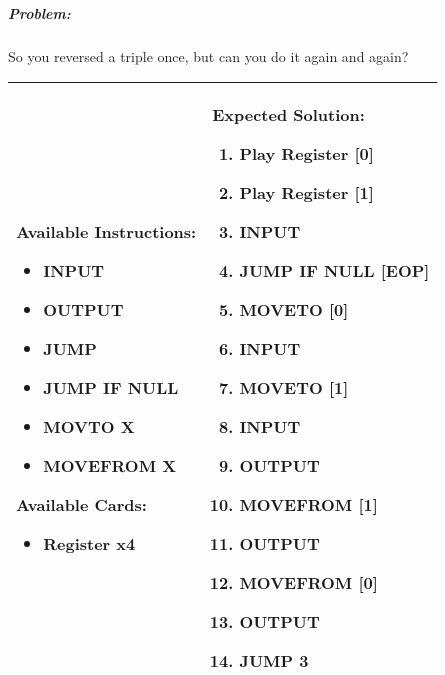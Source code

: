 \subparagraph{Problem:} So you reversed a triple once, but can you do it again and again?

\begin{center}
    \begin{tabular}{ | m{5cm} | m{9cm} | } 
        \hline
            \textbf{Available Instructions:} 
            \begin{itemize}
                \setlength\itemsep{-.35em}
                \item INPUT
                \item OUTPUT
                \item JUMP
                \item JUMP IF NULL
                \item MOVTO X
                \item MOVEFROM X
            \end{itemize}
            \textbf{Available Cards:} 
            \begin{itemize}
                \setlength\itemsep{-.35em}
                \item Register x4
            \end{itemize}& 
            \textbf{Expected Solution:} 
            \begin{enumerate}
                \setlength\itemsep{-.35em}
                \item Play Register [0]
                \item Play Register [1]
                \item INPUT
                \item JUMP IF NULL [EOP]
                \item MOVETO [0]
                \item INPUT
                \item MOVETO [1]
                \item INPUT
                \item OUTPUT
                \item MOVEFROM [1] 
                \item OUTPUT
                \item MOVEFROM [0]
                \item OUTPUT
                \item JUMP 3
            \end{enumerate}
            \\
        \hline
    \end{tabular}
\end{center}


